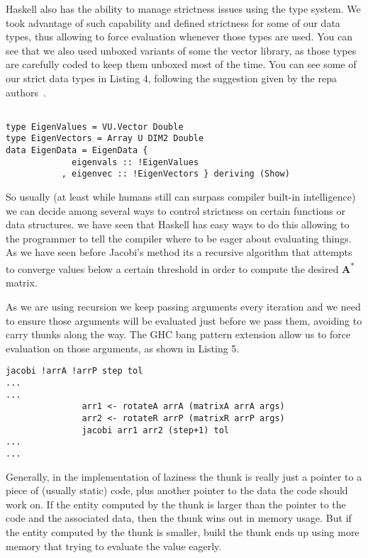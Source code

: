 \documentclass{tmr}
\begin{document}
Haskell also has the ability to manage strictness issues using the type system. We took advantage of such 
capability and defined strictness for some of our data types, thus allowing to force evaluation whenever
 those types are used. You can see that we also used unboxed variants of some the vector library,
as those types are carefully coded to keep them unboxed most of the time. You can see some of our strict data
types in Listing 4, following the suggestion given by the repa authors~\cite{bang}.

\begin{lstlisting}[float,captionpos=b,belowcaptionskip=4pt, caption= Strict data types for eigenvalue operations]

type EigenValues = VU.Vector Double
type EigenVectors = Array U DIM2 Double
data EigenData = EigenData {
             eigenvals :: !EigenValues
           , eigenvec :: !EigenVectors } deriving (Show)

\end{lstlisting}

So usually (at least while humans still can surpass compiler built-in intelligence) we can decide among several 
ways to control strictness on certain functions or data structures. we have seen that Haskell has easy ways to do
 this allowing to the programmer to tell the compiler where to be eager 
about evaluating things. As we have seen before Jacobi's method its a recursive algorithm that
 attempts to converge values below a certain threshold 
in order to compute the desired {\textbf A\textsuperscript{*}} matrix.

As we are using recursion we keep passing arguments every iteration and we need to ensure those arguments will be evaluated just before 
we pass them, avoiding to carry thunks along the way. The GHC bang pattern extension allow us to force evaluation on those arguments, as shown
in Listing 5.

\begin{lstlisting}[float,captionpos=b,belowcaptionskip=4pt, caption= Jacobi strict argument passing]
jacobi !arrA !arrP step tol
...
...
               arr1 <- rotateA arrA (matrixA arrA args)
               arr2 <- rotateR arrP (matrixR arrP args)
               jacobi arr1 arr2 (step+1) tol
...
...
\end{lstlisting}

Generally, in the implementation of laziness the thunk is really just a pointer to a piece of (usually static) code, plus another pointer 
to the data the code should work on. If the entity computed by the thunk is larger than the pointer to the code and the associated 
data, then the thunk wins out in memory usage. But if the entity computed by the thunk is smaller, build the thunk ends up using 
more memory that trying to evaluate the value eagerly.
\end{document}
